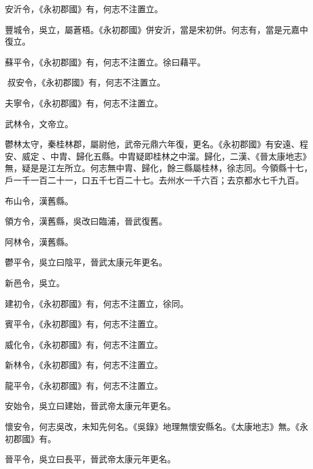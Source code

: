 \begin{pinyinscope}
 安沂令，《永初郡國》有，何志不注置立。



 豐城令，吳立，屬蒼梧。《永初郡國》併安沂，當是宋初併。何志有，當是元嘉中復立。



 蘇平令，《永初郡國》有，何志不注置立。徐曰藉平。



 叔安令，《永初郡國》有，何志不注置立。



 夫寧令，《永初郡國》有，何志不注置立。



 武林令，文帝立。


鬱林太守，秦桂林郡，屬尉他，武帝元鼎六年復，更名。《永初郡國》有安遠、程安、威定
 、中胄、歸化五縣。中胄疑即桂林之中溜。歸化，二漢、《晉太康地志》無，疑是是江左所立。何志無中胄、歸化，餘三縣屬桂林，徐志同。今領縣十七，戶一千一百二十一，口五千七百二十七。去州水一千六百；去京都水七千九百。



 布山令，漢舊縣。



 領方令，漢舊縣，吳改曰臨浦，晉武復舊。



 阿林令，漢舊縣。



 鬱平令，吳立曰陰平，晉武太康元年更名。



 新邑令，吳立。



 建初令，《永初郡國》有，何志不注置立，徐同。



 賓平令，《永初郡國》有，何志不注置立。



 威化令，《永初郡國》有，何志不注置立。



 新林令，《永初郡國》有，何志不注置立。



 龍平令，《永初郡國》有，何志不注置立。



 安始令，吳立曰建始，晉武帝太康元年更名。



 懷安令，何志吳改，未知先何名。《吳錄》地理無懷安縣名。《太康地志》無。《永初郡國》有。



 晉平令，吳立曰長平，晉武帝太康元年更名。




\end{pinyinscope}

